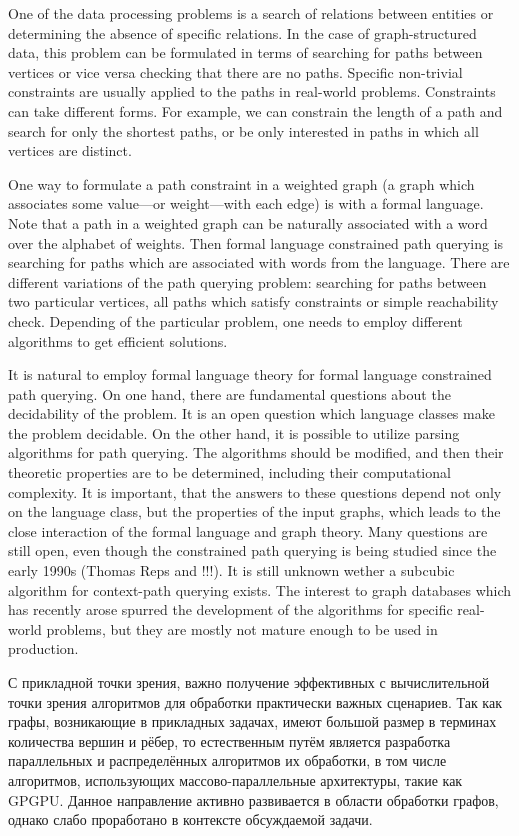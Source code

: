 \documentclass[12pt]{article}  %
\theoremstyle{remark}
\begin{document}
One of the data processing problems is a search of relations between entities or determining the absence of specific relations.
In the case of graph-structured data, this problem can be formulated in terms of searching for paths between vertices or vice versa checking that there are no paths.
Specific non-trivial constraints are usually applied to the paths in real-world problems.
Constraints can take different forms.
For example, we can constrain the length of a path and search for only the shortest paths, or be only interested in paths in which all vertices are distinct.

One way to formulate a path constraint in a weighted graph (a graph which associates some value---or weight---with each edge) is with a formal language.
Note that a path in a weighted graph can be naturally associated with a word over the alphabet of weights.
Then formal language constrained path querying is searching for paths which are associated with words from the language.
There are different variations of the path querying problem: searching for paths between two particular vertices, all paths which satisfy constraints or simple reachability check.
Depending of the particular problem, one needs to employ different algorithms to get efficient solutions.

It is natural to employ formal language theory for formal language constrained path querying.
On one hand, there are fundamental questions about the decidability of the problem.
It is an open question which language classes make the problem decidable.
On the other hand, it is possible to utilize parsing algorithms for path querying.
The algorithms should be modified, and then their theoretic properties are to be determined, including their computational complexity.
It is important, that the answers to these questions depend not only on the language class, but the properties of the input graphs, which leads to the close interaction of the formal language and graph theory.
Many questions are still open, even though the constrained path querying is being studied since the early 1990s (Thomas Reps and !!!).
It is still unknown wether a subcubic algorithm for context-path querying exists.
The interest to graph databases which has recently arose spurred the development of the algorithms for specific real-world problems, but they are mostly not mature enough to be used in production.


С прикладной точки зрения, важно получение эффективных с вычислительной точки зрения алгоритмов для обработки практически важных сценариев.
Так как графы, возникающие в прикладных задачах, имеют большой размер в терминах количества вершин и рёбер, то естественным путём является разработка параллельных и распределённых алгоритмов их обработки, в том числе алгоритмов, использующих массово-параллельные архитектуры, такие как GPGPU.
Данное направление активно развивается в области обработки графов, однако слабо проработано в контексте обсуждаемой задачи.
\end{document}
